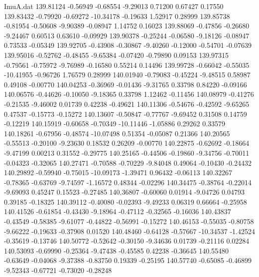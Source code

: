 \begin{filecontents}{ImuA.dat}
 139.81124   -0.56949   -0.68554   -9.29013    0.71200    0.67427    0.17550
 139.83432   -0.79920   -0.69272  -10.34178   -0.19633    1.52917    0.28999
 139.85738   -0.81954   -0.50608   -9.90389   -0.08947    1.14752    0.16023
 139.88069   -0.47856   -0.26680   -9.24467    0.60513    0.63610   -0.09929
 139.90378   -0.25244   -0.06580   -9.18126   -0.08947    0.73533   -0.05349
 139.92705   -0.43908   -0.30867   -9.40260   -0.12000   -0.54701   -0.07639
 139.95016   -0.52762   -0.48455   -9.65384   -0.07420   -0.79890    0.09153
 139.97315   -0.79561   -0.75972   -9.76989   -0.16580    0.55214    0.14496
 139.99728   -0.66042   -0.55035  -10.41955   -0.96726    1.76579    0.28999
 140.01940   -0.79083   -0.45224   -9.48515    0.58987    0.49108   -0.00770
 140.04253   -0.36969   -0.01436   -9.31765    0.33798    0.84220   -0.09166
 140.06576   -0.44626   -0.10050   -9.18365    0.33798    1.12462   -0.11456
 140.08979   -0.41276   -0.21535   -9.46002    0.01739    0.42238   -0.49621
 140.11306   -0.54676   -0.42592   -9.65265    0.47537   -0.15773   -0.15272
 140.13607   -0.50847   -0.77767   -9.69452    0.31508    0.14759   -0.12219
 140.15919   -0.60658   -0.70349  -10.11446   -1.05886    0.29262    0.33579
 140.18261   -0.67956   -0.48574  -10.07498    0.51354   -0.05087    0.21366
 140.20565   -0.55513   -0.20100   -9.23630    0.18532    0.26209   -0.00770
 140.22875   -0.62692   -0.18664   -9.47199    0.00213    0.31552   -0.29775
 140.25165   -0.44506   -0.19860   -9.34756   -0.70011   -0.04323   -0.32065
 140.27471   -0.70588   -0.70229   -9.84048    0.49064   -0.10430   -0.24432
 140.29892   -0.59940   -0.75015  -10.09173   -1.39471    0.96432   -0.06113
 140.32267   -0.78365   -0.63769   -9.74597   -1.16572    0.48344   -0.02296
 140.34475   -0.38764   -0.22014   -9.69093    0.45247    0.15523   -0.27485
 140.36807   -0.60060    0.01914   -9.04726    0.04793    0.39185   -0.18325
 140.39112   -0.40080   -0.02393   -9.49233    0.06319    0.66664   -0.25958
 140.41526   -0.61854   -0.43430   -9.18964   -0.47112   -0.32565   -0.16036
 140.43837   -0.43549   -0.58385   -9.61077   -0.44822   -0.56991   -0.15272
 140.46153   -0.55035   -0.80758   -9.66222   -0.19633   -0.37908    0.01520
 140.48460   -0.64128   -0.57667  -10.34537   -1.42524   -0.35619   -0.13746
 140.50772   -0.52642   -0.30150   -9.34636    0.01739   -0.21116    0.02284
 140.53093   -0.69990   -0.25364   -9.47438   -0.45585    0.42238   -0.36645
 140.55480   -0.63649   -0.04068   -9.37388   -0.83750    0.19339   -0.25195
 140.57740   -0.65085   -0.46899   -9.52343   -0.67721   -0.73020   -0.28248

\end{filecontents}
